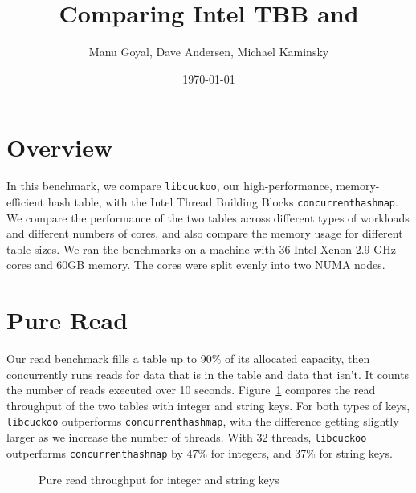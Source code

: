 \documentclass{article}
\title{Comparing Intel TBB {\tbbmap} and \libcuckoo}
\author{Manu Goyal, Dave Andersen, Michael Kaminsky}
\date{\today}
\newcommand{\tbbmap}{\texttt{concurrent\textunderscore hash\textunderscore map}}
\newcommand{\libcuckoo}{\texttt{libcuckoo}}
\begin{document}
\maketitle{}

\section*{Overview}

In this benchmark, we compare {\libcuckoo}, our high-performance,
memory-efficient hash table, with the Intel Thread Building Blocks {\tbbmap}. We
compare the performance of the two tables across different types of workloads
and different numbers of cores, and also compare the memory usage for different
table sizes. We ran the benchmarks on a machine with 36 Intel Xenon 2.9 GHz
cores and 60GB memory. The cores were split evenly into two NUMA nodes.

\section*{Pure Read}
Our read benchmark fills a table up to 90\% of its allocated capacity, then
concurrently runs reads for data that is in the table and data that isn't. It
counts the number of reads executed over 10 seconds. Figure~\ref{fig:pure-read}
compares the read throughput of the two tables with integer and string keys. For
both types of keys, {\libcuckoo} outperforms {\tbbmap}, with the difference
getting slightly larger as we increase the number of threads. With 32 threads,
{\libcuckoo} outperforms {\tbbmap} by 47\% for integers, and 37\% for string
keys.

\begin{figure}[!htbp]
  \centering
  \caption{Pure read throughput for integer and string keys}
  \label{fig:pure-read}
\end{figure}
\end{document}
